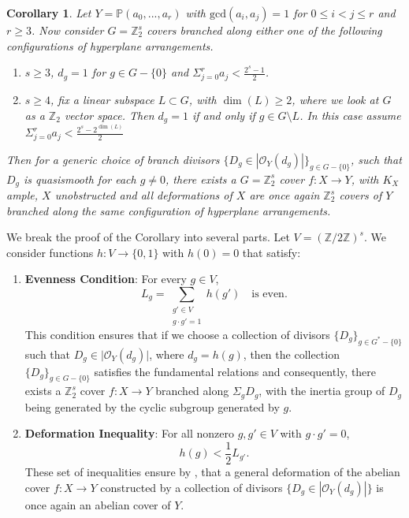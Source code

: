 \documentclass[12pt,twoside,]{amsart}
\let\footnote=\endnote
\theoremstyle{plain}
\newtheorem{corollary}[theorem]{Corollary}
\theoremstyle{definition}
\begin{document}
\begin{corollary}\label{hyperplane arrangements}
    Let $Y = \mathbb{P}(a_0,...,a_r)$ with $\textrm{gcd}(a_i,a_j) = 1$ for $0 \leq i < j \leq r$ and $r \geq 3$. Now consider $G = \mathbb{Z}_2^s$ covers branched along either one of the following configurations of hyperplane arrangements.
    \begin{enumerate}
        \item $s \geq 3$, $d_g = 1$ for $g \in G-\{0\}$ and $\Sigma_{j = 0}^r a_j < \displaystyle\frac{2^s-1}{2}$.
        \item $s \geq 4$, fix a linear subspace $L \subset G$, with $\operatorname{dim}(L) \geq 2$, where we look at $G$ as a $\mathbb{Z}_2$ vector space. Then $d_g = 1$ if and only if $g \in G\setminus L$. In this case assume
        $\Sigma_{j = 0}^r a_j < \displaystyle\frac{2^s-2^{\operatorname{dim}(L)}}{2}$ 
    \end{enumerate}
Then for a generic choice of branch divisors $\{D_g \in |\mathcal{O}_Y(d_g)|\}_{g \in G-\{0\}}$, such that $D_g$ is quasismooth for each $g \neq 0$, there exists a $G = \mathbb{Z}_2^s$ cover $f: X \to Y$, with $K_X$ ample, $X$ unobstructed and all deformations of $X$ are once again $\mathbb{Z}_2^s$ covers of $Y$ branched along the same configuration of hyperplane arrangements.
\end{corollary}

We break the proof of the Corollary into several parts.
Let \( V = (\mathbb{Z}/2\mathbb{Z})^s \). We consider functions \( h: V \to \{0,1\} \) with \( h(0) = 0 \) that satisfy:
\begin{enumerate}
    \item \textbf{Evenness Condition}: For every \( g \in V \),
        \[
        L_g = \sum_{\substack{g' \in V \\ g \cdot g' = 1}} h(g') \quad \text{is even}.
        \]
    This condition ensures that if we choose a collection of divisors $\{D_g\}_{g \in G^*-\{0\}}$ such that $D_g \in \lvert \mathcal{O}_{Y}(d_g) \rvert$, where $d_g = h(g)$, then the collection $\{D_g\}_{g \in G-\{0\}}$ satisfies the fundamental relations and consequently, there exists a $\mathbb{Z}_2^s$ cover $f: X \to Y$ branched along $\Sigma_g D_g$, with the inertia group of $D_g$ being generated by the cyclic subgroup generated by $g$. 
    \item \textbf{Deformation Inequality}: For all nonzero \( g, g' \in V \) with \( g \cdot g' = 0 \),
        \[
        h(g) < \frac{1}{2} L_{g'}.
        \]
    These set of inequalities ensure by , that a general deformation of the abelian cover $f: X \to Y$ constructed by a collection of divisors $\{D_g \in |\mathcal{O}_Y(d_g)|\}$ is once again an abelian cover of $Y$.  
\end{enumerate}
\end{document}
